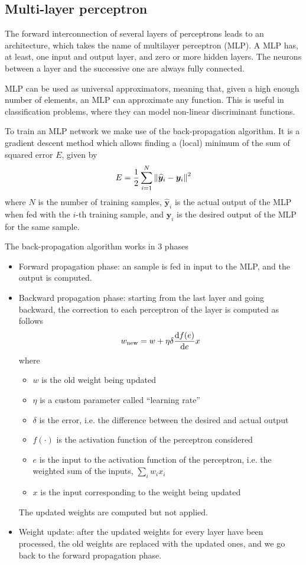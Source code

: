 \documentclass[oneside,onecolumn]{report}
\begin{document}
\subsection{Multi-layer perceptron}
The forward interconnection of several layers of perceptrons leads to an architecture, which takes the name of multilayer perceptron (MLP).
A MLP has, at least, one input and output layer, and zero or more hidden layers.
The neurons between a layer and the successive one are always fully connected.

MLP can be used as universal approximators, meaning that, given a high enough number of elements, an MLP can approximate any function.
This is useful in classification problems, where they can model non-linear discriminant functions.

To train an MLP network we make use of the back-propagation algorithm.
It is a gradient descent method which allows finding a (local) minimum of the sum of squared error $E$, given by
$$ E = \frac{1}{2} \sum_{i = 1}^N \norm{\widehat{\bm {y}}_i - \bm y_i}^2 $$
where $N$ is the number of training samples, $\widehat{\bm {y}}_i$ is the actual output of the MLP when fed with the $i$-th training sample, and $\bm y_i$ is the desired output of the MLP for the same sample.

The back-propagation algorithm works in 3 phases
\begin{itemize}
    \item Forward propagation phase: an sample is fed in input to the MLP, and the output is computed.

    \item Backward propagation phase: starting from the last layer and going backward, the correction to each perceptron of the layer is computed as follows
    $$ w_\text{new} = w + \eta \delta \dv{f(e)}{e} x $$
    where
    \begin{itemize}
        \item $w$ is the old weight being updated
        \item $\eta$ is a custom parameter called ``learning rate''
        \item $\delta$ is the error, i.e. the difference between the desired and actual output
        \item $f(\cdot)$ is the activation function of the perceptron considered
        \item $e$ is the input to the activation function of the perceptron, i.e. the weighted sum of the inputs, $\sum_{i} w_i x_i$
        \item $x$ is the input corresponding to the weight being updated
    \end{itemize}

    The updated weights are computed but not applied.

    \item Weight update: after the updated weights for every layer have been processed, the old weights are replaced with the updated ones, and we go back to the forward propagation phase.
\end{itemize}
\end{document}
